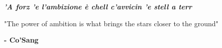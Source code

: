 \cleardoublepage
\thispagestyle{empty}
\begin{flushright}
{\itshape 
        \textbf{'A forz 'e l'ambizione è chell c'avvicin 'e stell a terr}

        "The power of ambition is what brings the stars closer to the ground"}

        \textbf{- Co'Sang}
\end{flushright}
\cleardoublepage